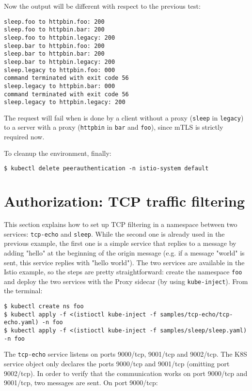 \noindent Now the output will be different with respect to the previous test:

\begin{lstlisting}
sleep.foo to httpbin.foo: 200
sleep.foo to httpbin.bar: 200
sleep.foo to httpbin.legacy: 200
sleep.bar to httpbin.foo: 200
sleep.bar to httpbin.bar: 200
sleep.bar to httpbin.legacy: 200
sleep.legacy to httpbin.foo: 000
command terminated with exit code 56
sleep.legacy to httpbin.bar: 000
command terminated with exit code 56
sleep.legacy to httpbin.legacy: 200
\end{lstlisting}

\noindent The request will fail when is done by a client without a proxy (\texttt{sleep} in \texttt{legacy}) to a server with a proxy (\texttt{httpbin} in \texttt{bar} and \texttt{foo}), since mTLS is strictly required now.

\noindent To cleanup the environment, finally:

\begin{lstlisting}
$ kubectl delete peerauthentication -n istio-system default
\end{lstlisting}

\section{Authorization: TCP traffic filtering}
This section explains how to set up TCP filtering in a namespace between two services: \texttt{tcp-echo} and \texttt{sleep}. While the second one is already used in the previous example, the first one is a simple service that replies to a message by adding "hello" at the beginning of the origin message (e.g. if a message "world" is sent, this service replies with "hello world"). The two services are available in the Istio example, so the steps are pretty straightforward: create the namespace \texttt{foo} and deploy the two services with the Proxy sidecar (by using \texttt{kube-inject}). From the terminal:

\begin{lstlisting}[basicstyle = \scriptsize]
$ kubectl create ns foo
$ kubectl apply -f <(istioctl kube-inject -f samples/tcp-echo/tcp-echo.yaml) -n foo
$ kubectl apply -f <(istioctl kube-inject -f samples/sleep/sleep.yaml) -n foo
\end{lstlisting}

\noindent The \texttt{tcp-echo} service listens on ports 9000/tcp, 9001/tcp and 9002/tcp. The K8S service object only declares the ports 9000/tcp and 9001/tcp (omitting port 9002/tcp). In order to verify that the communication works on port 9000/tcp and 9001/tcp, two messages are sent. On port 9000/tcp:

